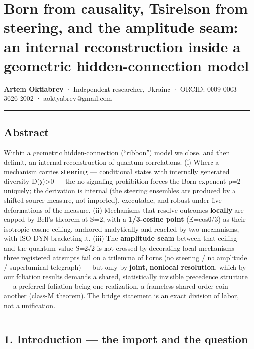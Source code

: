 \documentclass[
  11pt]{article}
\author{}
\date{}
\begin{document}
\section{Born from causality, Tsirelson from steering, and the amplitude
seam: an internal reconstruction inside a geometric hidden-connection
model}\label{born-from-causality-tsirelson-from-steering-and-the-amplitude-seam-an-internal-reconstruction-inside-a-geometric-hidden-connection-model}

\textbf{Artem Oktiabrev} · Independent researcher, Ukraine · ORCID:
0009-0003-3626-2002 · aoktyabrev@gmail.com

\begin{center}\rule{0.5\linewidth}{0.5pt}\end{center}

\subsection{Abstract}\label{abstract}

Within a geometric hidden-connection (``ribbon'') model we close, and
then delimit, an internal reconstruction of quantum correlations. (i)
Where a mechanism carries \textbf{steering} --- conditional states with
internally generated diversity D(χ)\textgreater0 --- the no-signaling
prohibition forces the Born exponent p=2 uniquely; the derivation is
internal (the steering ensembles are produced by a shifted source
measure, not imported), executable, and robust under five deformations
of the measure. (ii) Mechanisms that resolve outcomes \textbf{locally}
are capped by Bell's theorem at S=2, with a \textbf{1/3-cosine point}
(E=cosθ/3) as their isotropic-cosine ceiling, anchored analytically and
reached by two mechanisms, with ISO-DYN bracketing it. (iii) The
\textbf{amplitude seam} between that ceiling and the quantum value S=2√2
is not crossed by decorating local mechanisms --- three registered
attempts fail on a trilemma of horns (no steering / no amplitude /
superluminal telegraph) --- but only by \textbf{joint, nonlocal
resolution}, which by our foliation results demands a shared,
statistically invisible precedence structure --- a preferred foliation
being one realization, a frameless shared order-coin another (class-M
theorem). The bridge statement is an exact division of labor, not a
unification.

\begin{center}\rule{0.5\linewidth}{0.5pt}\end{center}

\subsection{1. Introduction --- the import and the
question}\label{introduction-the-import-and-the-question}
\end{document}
